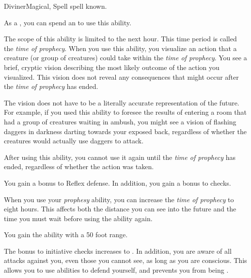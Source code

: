     \begin{feat}{Diviner}{Magical, Spell}
        \featpre {} spell known.
        \featben

         As a , you can spend an  to use this ability.
        \begin{ability}
            \begin{spelleffects}
                \spellspecial The scope of this ability is limited to the next hour.
                This time period is called the \textit{time of prophecy}.
                When you use this ability, you visualize an action that a creature (or group of creatures) could take within the \textit{time of prophecy}.
                \spelleffect You see a brief, cryptic vision describing the most likely outcome of the action you visualized.
                This vision does not reveal any consequences that might occur after the \textit{time of prophecy} has ended.

                The vision does not have to be a literally accurate representation of the future.
                For example, if you used this ability to foresee the results of entering a room that had a group of creatures waiting in ambush, you might see a vision of flashing daggers in darkness darting towards your exposed back, regardless of whether the creatures would actually use daggers to attack.

                After using this ability, you cannot use it again until the \textit{time of prophecy} has ended, regardless of whether the action was taken.
            \end{spelleffects}
        \end{ability}

         You gain a  bonus to Reflex defense.
        In addition, you gain a  bonus to  checks.

         When you use your \textit{prophesy} ability, you can increase the \textit{time of prophecy} to eight hours.
        This affects both the distance you can see into the future and the time you must wait before using the ability again.

         You gain the  ability with a 50 foot range.

         The bonus to initiative checks increases to .
        In addition, you are aware of all attacks against you, even those you cannot see, as long as you are conscious.
        This allows you to use abilities to defend yourself, and prevents you from being \unaware.


\end{feat}
